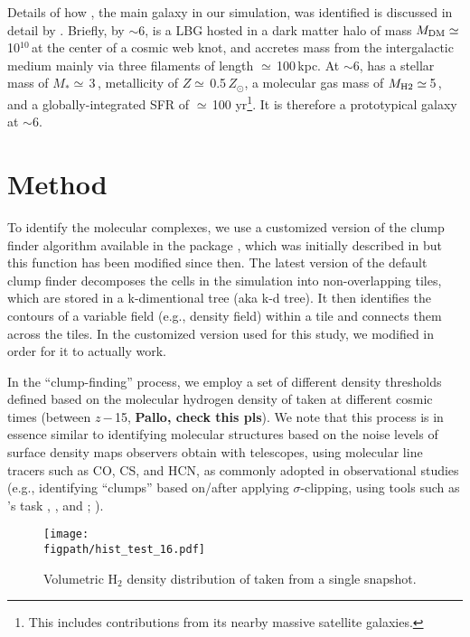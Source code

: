 \documentclass[apj]{emulateapj} %
\begin{document}
Details of how \flower, the main galaxy in our simulation,
was identified is discussed in detail by \citet{Pallottini17a}.
Briefly, by \z$\sim$6, \flower is a LBG hosted in 
a dark matter halo of mass $M_{\rm DM}\simeq$\,10$^{10}$\,\Msun at the center of a cosmic web knot, and 
accretes mass from the intergalactic medium mainly via three filaments of length $\simeq$\,100\,kpc.
At \z$\sim$6, \flower has a stellar mass of $M_*\simeq$\,3\,\Msun,
metallicity of $Z\simeq$\,0.5\,$Z_{\odot}$,
a molecular gas mass of $M_{\rm H2}\simeq$\,5\,\Msun,
and a globally-integrated SFR of $\simeq$\,100\,\Msun\,yr\pmOne\footnote{This includes contributions from its nearby massive satellite galaxies.}.
It is therefore a prototypical galaxy at \z$\sim$6.



\section{Method} \label{sec:method}

To identify the molecular complexes, we use a customized version of the clump finder algorithm 
available in the  package , which was initially described in \citet{Smith09a}
but this function has been modified since then.
The latest version of the default  clump finder decomposes the cells in the simulation
into non-overlapping tiles, which are stored in a k-dimentional tree (aka k-d tree).
It then identifies the contours of a variable field (e.g., density field) within a tile and connects them across 
the tiles. In the customized version used for this study, we modified  in order for it to actually work.

In the ``clump-finding'' process, we employ a set of different density thresholds defined based on the
molecular hydrogen density of \flower taken at different cosmic times (between $z$\,$-$\,15, {\bf Pallo, check this pls}).
We note that this process is in essence similar to 
identifying molecular structures based on the noise levels of surface density maps 
observers obtain with telescopes, using molecular line tracers such as CO, CS, and HCN,
as commonly adopted in observational studies (e.g., identifying 
``clumps'' based on/after applying $\sigma$-clipping, 
using tools such as 's task , , 
and ; \citealt{Williams94a, Rosolowsky06a}).


\begin{figure}[htbp]
\centering
\texttt{[image: \\figpath/hist\_test\_16.pdf]}  
\caption{
Volumetric H$_2$ density distribution of \flower taken from a single snapshot.
\label{fig:h2density}}
\end{figure}
\end{document}
